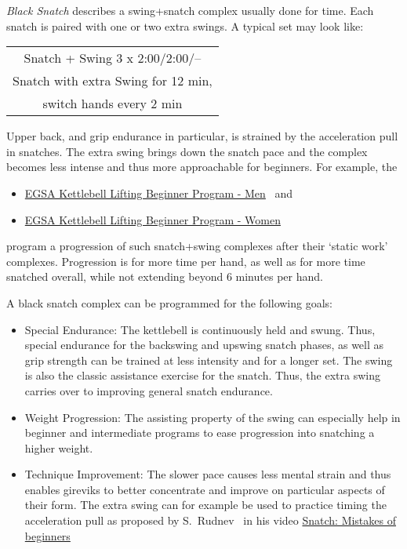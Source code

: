 \documentclass[a4paper,11pt,oneside]{article}
\begin{document}
\emph{Black Snatch} describes a swing+snatch complex usually done for time. Each 
snatch is paired with one or two extra swings. A typical set may look like:

\begin{center}
\begin{tabular}{c}
\hline
Snatch + Swing 3 x 2:00/2:00/-- \\
Snatch with extra Swing for 12 min, \\
switch hands every 2 min \\
\hline
\end{tabular}
\end{center}

Upper back, and grip endurance in particular, is strained by the acceleration pull 
in snatches. The extra swing brings down the snatch pace and the complex becomes 
less intense and thus more approachable for beginners.
For example, the 
\begin{itemize}
  \item \href{https://www.elitegirevoy.com/kettlebell-lifting-beginners-program-men/}
         {EGSA Kettlebell Lifting Beginner Program - Men}~
         \cite{egsa_kb_lifting_beginner_program_men} and
  \item \href{https://www.elitegirevoy.com/kettlebell-lifting-beginners-program-women/}
         {EGSA Kettlebell Lifting Beginner Program - Women}~
         \cite{egsa_kb_lifting_beginner_program_women}
\end{itemize}
program a progression of such snatch+swing complexes after their `static work' 
complexes. Progression is for more time per hand, as well as for more time snatched 
overall, while not extending beyond 6 minutes per hand.

A black snatch complex can be programmed for the following goals:

\begin{itemize}

  \item{Special Endurance:} The kettlebell is continuously held and swung. Thus, 
  special endurance for the backswing and upswing snatch phases, as well as grip 
  strength can be trained at less intensity and for a longer set. The swing is also 
  the classic assistance exercise for the snatch. Thus, the extra swing carries over 
  to improving general snatch endurance.
  
  \item{Weight Progression:} The assisting property of the swing can especially help 
  in beginner and intermediate programs to ease progression into snatching a higher 
  weight.
  
  \item{Technique Improvement:} The slower pace causes less mental strain and thus 
  enables gireviks to better concentrate and improve on particular aspects of their 
  form. The extra swing can for example be used to practice timing the acceleration 
  pull as proposed by S.~Rudnev~\cite{rkbyten_snatch_beginner_mistakes} in his video 
  \href{https://youtu.be/N186yUP9LcU?t=89}{Snatch: Mistakes of beginners}  

\end{itemize}
\end{document}
